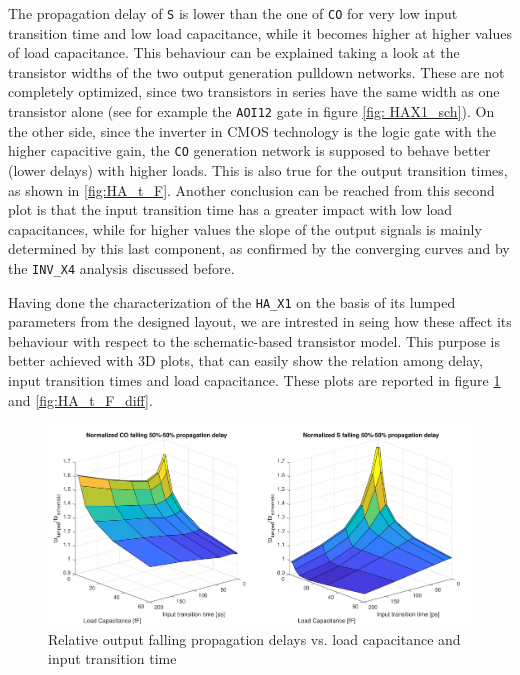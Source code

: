 \documentclass[a4paper]{article}
\newcommand{\inv}{\texttt{INV\_X4}\xspace}
\newcommand{\ha}{\texttt{HA\_X1}\xspace}
\begin{document}
The propagation delay of \texttt{S} is lower than the one of \texttt{CO} for very low input transition time and low load capacitance, while it becomes higher at higher values of load capacitance. This behaviour can be explained taking a look at the transistor widths of the two output generation pulldown networks. These are not completely optimized, since two transistors in series have the same width as one transistor alone (see for example the \texttt{AOI12} gate in figure \ref{fig: HAX1_sch}). On the other side, since the inverter in CMOS technology is the logic gate with the higher capacitive gain, the \texttt{CO} generation network is supposed to behave better (lower delays) with higher loads. This is also true for the output transition times, as shown in \ref{fig:HA_t_F}. Another conclusion can be reached from this second plot is that the input transition time has a greater impact with low load capacitances, while for higher values the slope of the output signals is mainly determined by this last component, as confirmed by the converging curves and by the \inv analysis discussed before.

Having done the characterization of the \ha on the basis of its lumped parameters from the designed layout, we are intrested in seing how these affect its behaviour with respect to the schematic-based transistor model. This purpose is better achieved with 3D plots, that can easily show the relation among delay, input transition times and load capacitance. These plots are reported in figure \ref{fig:HA_tp_L_diff} and \ref{fig:HA_t_F_diff}.

\begin{figure}[ht]
	\includegraphics[width=\linewidth]{Images/HA/tp_L_diff_crop.pdf}
	\caption{Relative output falling propagation delays vs. load capacitance and input transition time}
	\label{fig:HA_tp_L_diff}
\end{figure}
\end{document}
